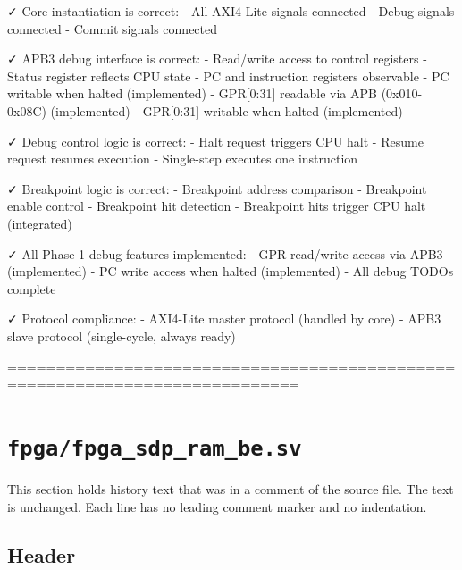 \begin{record}
\begin{textblock}
✓ Core instantiation is correct:
  - All AXI4-Lite signals connected
  - Debug signals connected
  - Commit signals connected

✓ APB3 debug interface is correct:
  - Read/write access to control registers
  - Status register reflects CPU state
  - PC and instruction registers observable
  - PC writable when halted (implemented)
  - GPR[0:31] readable via APB (0x010-0x08C) (implemented)
  - GPR[0:31] writable when halted (implemented)

✓ Debug control logic is correct:
  - Halt request triggers CPU halt
  - Resume request resumes execution
  - Single-step executes one instruction

✓ Breakpoint logic is correct:
  - Breakpoint address comparison
  - Breakpoint enable control
  - Breakpoint hit detection
  - Breakpoint hits trigger CPU halt (integrated)

✓ All Phase 1 debug features implemented:
  - GPR read/write access via APB3 (implemented)
  - PC write access when halted (implemented)
  - All debug TODOs complete

✓ Protocol compliance:
  - AXI4-Lite master protocol (handled by core)
  - APB3 slave protocol (single-cycle, always ready)

============================================================================
\end{textblock}

\end{record}

\section{\texttt{fpga/fpga\_sdp\_ram\_be.sv}}\label{cr:mod:fpga-sdp-ram-be}

This section holds history text that was in a comment of the source file. The text is unchanged. Each line has no leading comment marker and no indentation.

\begin{record}

\subsection*{Header}


\end{record}

